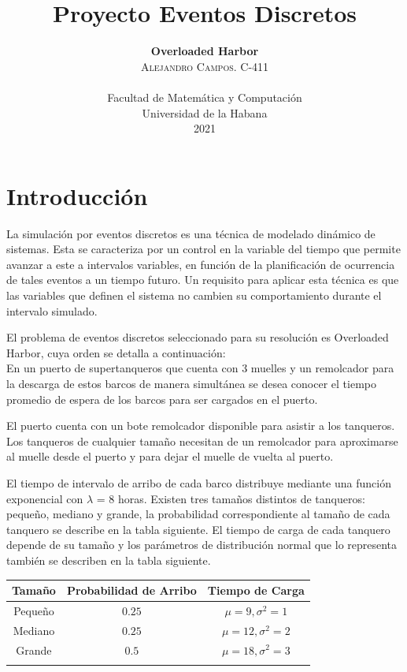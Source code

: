 \documentclass[twoside]{article}
\title{\vspace{-15mm}\fontsize{20pt}{10pt}\selectfont\textbf{Proyecto Eventos Discretos}}
\author{
\large
\textbf{\large Overloaded Harbor} \\[1.5cm]
\textsc{Alejandro Campos. C-411}\\\\[2mm]
\normalsize Facultad de Matem\'atica y Computaci\'on \\
\normalsize Universidad de la Habana \\
\normalsize 2021 \\[2cm]
\vspace{-5mm}
}
\date{}
\begin{document}
\maketitle

\thispagestyle{fancy} 

\section{Introducci\'on}

La simulaci\'on por eventos discretos es una t\'ecnica de modelado din\'amico de sistemas. Esta se caracteriza por un control en la variable del tiempo que permite avanzar a este a intervalos variables, en funci\'on de la planificaci\'on de ocurrencia de tales eventos a un tiempo futuro. Un requisito para aplicar esta t\'ecnica es que las variables que definen el sistema no cambien su comportamiento durante el intervalo simulado.

El problema de eventos discretos seleccionado para su resoluci\'on es Overloaded Harbor, cuya orden se detalla a continuaci\'on:\\

En un puerto de supertanqueros que cuenta con 3 muelles y un remolcador
para la descarga de estos barcos de manera simult\'anea se desea conocer el tiempo
promedio de espera de los barcos para ser cargados en el puerto.

El puerto cuenta con un bote remolcador disponible para asistir a los tanqueros.
Los tanqueros de cualquier tama\~no necesitan de un remolcador para
aproximarse al muelle desde el puerto y para dejar el muelle de vuelta al puerto.

El tiempo de intervalo de arribo de cada barco distribuye mediante una funci\'on exponencial con $\lambda$ = 8 horas. Existen tres tama\~nos distintos de tanqueros:
peque\~no, mediano y grande, la probabilidad correspondiente al tama\~no de cada
tanquero se describe en la tabla siguiente. El tiempo de carga de cada tanquero
depende de su tama\~no y los par\'ametros de distribuci\'on normal que lo representa
tambi\'en se describen en la tabla siguiente.\\

\begin{tabular}{c c c}
Tama\~no & Probabilidad de Arribo & Tiempo de Carga \\ \hline
Peque\~no & $0.25$ & $\mu = 9, \sigma^2 = 1$ \\
Mediano & $0.25$ & $\mu = 12, \sigma^2 = 2$ \\
Grande & $0.5$  & $\mu = 18, \sigma^2 = 3$ \\\\
\end{tabular}
\end{document}
